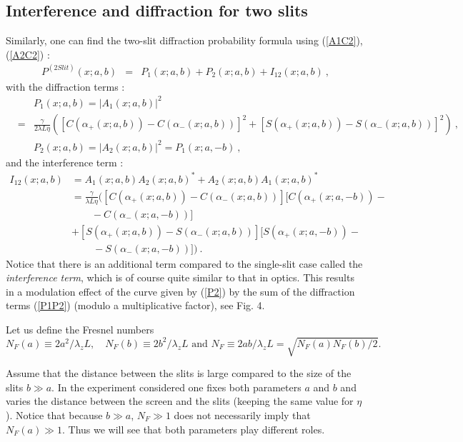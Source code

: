 \documentclass[12pt]{article}   %
\begin{document}
\subsection{Interference and diffraction for two slits}
Similarly, one can find the two-slit diffraction probability
formula using (\ref{A1C2}), (\ref{A2C2}) :
\begin{eqnarray}\label{P2}
P^{(2 Slit)}(x;a,b) &=& P_1(x;a,b)+P_2(x;a,b)+I_{12}(x;a,b)\ ,
\end{eqnarray}
with the diffraction terms :
\begin{eqnarray}\label{P1P2}
&&P_1(x;a,b)= |A_1(x;a,b)|^2
{}\nonumber\\{}&=&\frac{\gamma}{2\lambda
L\eta}\left([C(\alpha_{+}(x;a,b))-C(\alpha_{-}(x;a,b))]^2+[S(\alpha_{+}(x;a,b))-S(\alpha_{-}(x;a,b))]^2\right)\
, {}\nonumber\\{}&& P_2(x;a,b) = |A_2(x;a,b)|^2 = P_1(x;a,-b)\ ,
\end{eqnarray}
and the interference term :
\begin{align}\label{I12}
I_{12}(x;a,b)&=A_1(x;a,b)A_2(x;a,b)^* + A_2(x;a,b) A_1(x;a,b)^*
{}\nonumber\\{}&=\frac{\gamma}{\lambda L\eta}
([C(\alpha_{+}(x;a,b))- C(\alpha_{-}(x;a,b))][C(\alpha_{+}(x;a,-b))- \nonumber\\ & \quad\quad - C(\alpha_{-}(x;a,-b))]
{}\nonumber\\{}&+[S(\alpha_{+}(x;a,b))-S(\alpha_{-}(x;a,b))][S(\alpha_{+}(x;a,-b))- \nonumber\\ & \quad\quad\, - S(\alpha_{-}(x;a,-b))])\ .
\end{align}
Notice that there is an additional term compared to the
single-slit case called the \textit{interference term}, which is
of course quite similar to that in optics.\cite{Optics} This
results in a modulation effect of the curve given by (\ref{P2}) by
the sum of the diffraction terms (\ref{P1P2}) (modulo a
multiplicative factor), see Fig. 4.

Let us define the Fresnel numbers
$$ N_F(a)\equiv2a^2/\lambda_z L, \quad
N_F(b)\equiv2b^2/\lambda_z L \mbox{ and } N_F\equiv2ab/\lambda_z L =
\sqrt{N_F(a)N_F(b)/2}.  $$


Assume that the distance between the slits is large compared to
the size of the slits $b\gg a$. In the experiment considered one
fixes both parameters $a$ and $b$ and varies the distance between
the screen and the slits (keeping the same value for $\eta$).
Notice that because $b\gg a$, $N_F\gg 1$ does not necessarily
imply that $N_F(a)\gg1$. Thus we will see that both parameters
play different roles.
\end{document}
